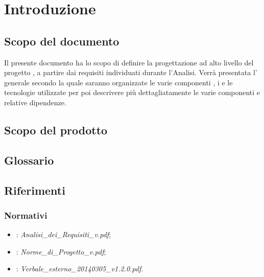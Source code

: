 \newpage
\tableofcontents

\newpage
\listoftables	%
\listoffigures 	%

\newpage
\section{Introduzione}
\subsection{Scopo del documento}
Il presente documento ha lo scopo di definire la progettazione ad alto livello del progetto \textbf{}, a partire dai requisiti individuati durante l'Analisi. Verrà presentata l' generale secondo la quale saranno organizzate le varie componenti , i  e le tecnologie utilizzate per poi descrivere più dettagliatamente le varie componenti e relative dipendenze.

\subsection{Scopo del prodotto}
\Prodotto{}

\subsection{Glossario}
\Glossario{}

\subsection{Riferimenti}

\subsubsection{Normativi}
\begin{itemize}
\item {}: \emph{Analisi\_{}dei\_{}Requisiti\_{}v\versioneAnalisiDeiRequisiti{}.pdf};
\item {}: \emph{Norme\_{}di\_{}Progetto\_{}v\versioneNormeDiProgetto{}.pdf};
\item {}: \emph{Verbale\_esterno\_20140305\_v1.2.0.pdf}.
\end{itemize}

